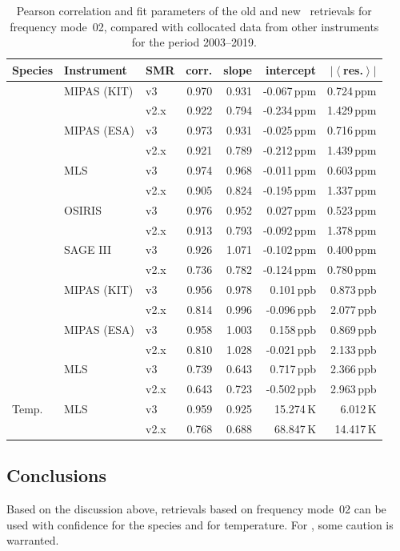 \begin{table}[tbhp]
\centering
\caption{Pearson correlation and fit parameters of the old and new \smr\
retrievals for frequency mode~02, compared with collocated data from other
instruments for the period 2003--2019.
}
\label{tab:fm02:stats}
\begin{tabular}{lllrrrr}
    \toprule
    \textbf{Species} & \textbf{Instrument} & \textbf{SMR} & \textbf{corr.} & \textbf{slope} & \textbf{intercept} & \textbf{$\left|\left<\right.\right.$res.$\left.\left.\right>\right|$} \\
    \midrule
    \chem{O3}       & MIPAS (KIT)   & v3    & 0.970 & 0.931 & -0.067\,ppm   & 0.724\,ppm \\
                    &               & v2.x  & 0.922 & 0.794 & -0.234\,ppm   & 1.429\,ppm \\
    \cline{2-7}
                    & MIPAS (ESA)   & v3    & 0.973 & 0.931 & -0.025\,ppm   & 0.716\,ppm \\
                    &               & v2.x  & 0.921 & 0.789 & -0.212\,ppm   & 1.439\,ppm \\
    \cline{2-7}
                    & MLS           & v3    & 0.974 & 0.968 & -0.011\,ppm   & 0.603\,ppm \\
                    &               & v2.x  & 0.905 & 0.824 & -0.195\,ppm   & 1.337\,ppm \\
    \cline{2-7}
                    & OSIRIS        & v3    & 0.976 & 0.952 &  0.027\,ppm   & 0.523\,ppm \\
                    &               & v2.x  & 0.913 & 0.793 & -0.092\,ppm   & 1.378\,ppm \\
    \cline{2-7}
                    & SAGE III      & v3    & 0.926 & 1.071 & -0.102\,ppm   & 0.400\,ppm \\
                    &               & v2.x  & 0.736 & 0.782 & -0.124\,ppm   & 0.780\,ppm \\
    \midrule
    \chem{HNO_3}    & MIPAS (KIT)   & v3    & 0.956 & 0.978 &  0.101\,ppb   & 0.873\,ppb \\
                    &               & v2.x  & 0.814 & 0.996 & -0.096\,ppb   & 2.077\,ppb \\
    \cline{2-7}
                    & MIPAS (ESA)   & v3    & 0.958 & 1.003 &  0.158\,ppb   & 0.869\,ppb \\
                    &               & v2.x  & 0.810 & 1.028 & -0.021\,ppb   & 2.133\,ppb \\
    \cline{2-7}
                    & MLS           & v3    & 0.739 & 0.643 &  0.717\,ppb   & 2.366\,ppb \\
                    &               & v2.x  & 0.643 & 0.723 & -0.502\,ppb   & 2.963\,ppb \\
    \midrule
    Temp.           & MLS           & v3    & 0.959 & 0.925 & 15.274\,K     &  6.012\,K \\
                    &               & v2.x  & 0.768 & 0.688 & 68.847\,K     & 14.417\,K \\
    \bottomrule
\end{tabular}
\end{table}

\subsection{Conclusions}
\label{sec:fm02:conclusions}
Based on the discussion above, retrievals based on frequency mode~02 can be
used with confidence for the species \chem{O_3} and for temperature. For
\chem{HNO_3}, some caution is warranted.  